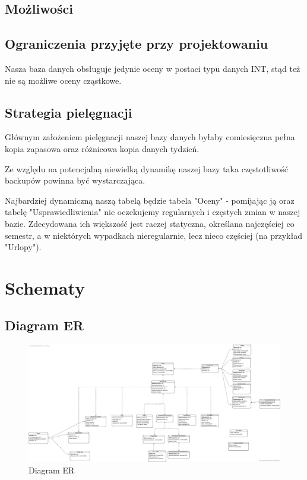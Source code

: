\documentclass[60pt]{article}
\begin{document}
\subsection{Możliwości}

\subsection{Ograniczenia przyjęte przy projektowaniu}

Nasza baza danych obsługuje jedynie oceny w postaci typu danych INT, stąd też nie są możliwe oceny cząstkowe. 

\subsection{Strategia pielęgnacji}

Głównym założeniem pielęgnacji naszej bazy danych byłaby comiesięczna pełna kopia zapasowa oraz różnicowa kopia danych tydzień. 

Ze względu na potencjalną niewielką dynamikę naszej bazy taka częstotliwość backupów powinna być wystarczająca. 

Najbardziej dynamiczną naszą tabelą będzie tabela "Oceny" - pomijając ją oraz tabelę "Usprawiedliwienia" nie oczekujemy regularnych i częstych zmian w naszej bazie. Zdecydowana ich większość jest raczej statyczna, określana najczęściej co semestr, a w niektórych wypadkach nieregularnie, lecz nieco częściej (na przykład "Urlopy").

\newpage
\section{Schematy}

\subsection{Diagram ER}

\begin{figure}
  \includegraphics[width=\linewidth]{diagram_ER.png}
  \caption{Diagram ER}
  \label{Diagram ER}
\end{figure}
\end{document}
